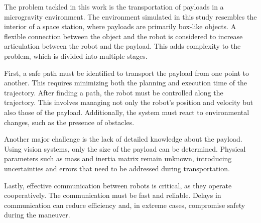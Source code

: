 The problem tackled in this work is the transportation of payloads in a microgravity environment. The environment simulated in this study resembles the interior of a space station, where payloads are primarily box-like objects. A flexible connection between the object and the robot is considered to increase articulation between the robot and the payload. This adds complexity to the problem, which is divided into multiple stages.

First, a safe path must be identified to transport the payload from one point to another. This requires minimizing both the planning and execution time of the trajectory. After finding a path, the robot must be controlled along the trajectory. This involves managing not only the robot's position and velocity but also those of the payload. Additionally, the system must react to environmental changes, such as the presence of obstacles.

Another major challenge is the lack of detailed knowledge about the payload. Using vision systems, only the size of the payload can be determined. Physical parameters such as mass and inertia matrix remain unknown, introducing uncertainties and errors that need to be addressed during transportation.

Lastly, effective communication between robots is critical, as they operate cooperatively. The communication must be fast and reliable. Delays in communication can reduce efficiency and, in extreme cases, compromise safety during the maneuver.
